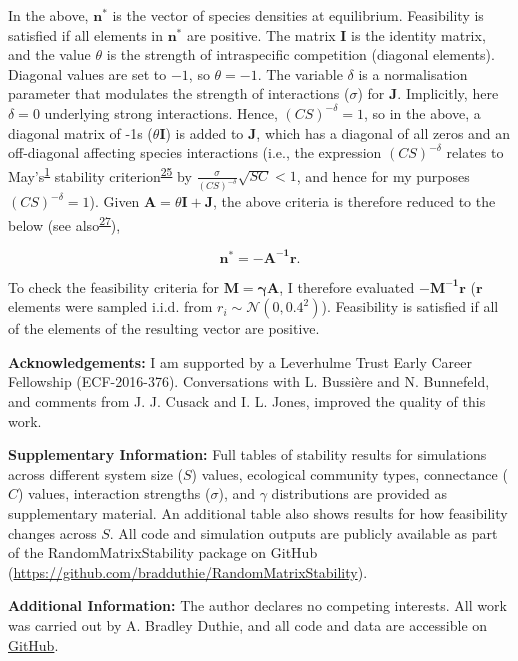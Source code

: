 \documentclass[]{article}
\begin{document}
In the above, \(\mathbf{n^{*}}\) is the vector of species densities at
equilibrium. Feasibility is satisfied if all elements in
\(\mathbf{n^{*}}\) are positive. The matrix \(\mathbf{I}\) is the
identity matrix, and the value \(\theta\) is the strength of
intraspecific competition (diagonal elements). Diagonal values are set
to \(-1\), so \(\theta = -1\). The variable \(\delta\) is a
normalisation parameter that modulates the strength of interactions
(\(\sigma\)) for \(\mathbf{J}\). Implicitly, here \(\delta = 0\)
underlying strong interactions. Hence, \((CS)^{-\delta} = 1\), so in the
above, a diagonal matrix of -1s (\(\theta \mathbf{I}\)) is added to
\(\mathbf{J}\), which has a diagonal of all zeros and an off-diagonal
affecting species interactions (i.e., the expression \((CS)^{-\delta}\)
relates to May's\textsuperscript{\protect\hyperlink{ref-May1972}{1}}
stability
criterion\textsuperscript{\protect\hyperlink{ref-Dougoud2018}{25}} by
\(\frac{\sigma}{(CS)^{-\delta}}\sqrt{SC} < 1\), and hence for my
purposes \((CS)^{-\delta} = 1\)). Given
\(\mathbf{A} = \theta\mathbf{I + J}\), the above criteria is therefore
reduced to the below (see
also\textsuperscript{\protect\hyperlink{ref-Servan2018}{27}}),

\[\mathbf{n^{*} = -A^{-1}r}.\]

To check the feasibility criteria for \(\mathbf{M = \gamma A}\), I
therefore evaluated \(\mathbf{-M^{-1}r}\) (\(\mathbf{r}\) elements were
sampled i.i.d. from \(r_{i} \sim \mathcal{N}(0, 0.4^{2})\)). Feasibility
is satisfied if all of the elements of the resulting vector are
positive.

\textbf{Acknowledgements:} I am supported by a Leverhulme Trust Early
Career Fellowship (ECF-2016-376). Conversations with L. Bussière and N.
Bunnefeld, and comments from J. J. Cusack and I. L. Jones, improved the
quality of this work.

\textbf{Supplementary Information:} Full tables of stability results for
simulations across different system size (\(S\)) values, ecological
community types, connectance (\(C\)) values, interaction strengths
(\(\sigma\)), and \(\gamma\) distributions are provided as supplementary
material. An additional table also shows results for how feasibility
changes across \(S\). All code and simulation outputs are publicly
available as part of the RandomMatrixStability package on GitHub
(\url{https://github.com/bradduthie/RandomMatrixStability}).

\textbf{Additional Information:} The author declares no competing
interests. All work was carried out by A. Bradley Duthie, and all code
and data are accessible on
\href{https://github.com/bradduthie/RandomMatrixStability}{GitHub}.
\end{document}
